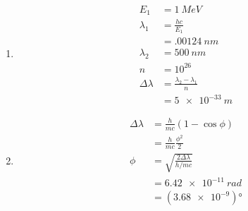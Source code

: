 \documentclass{article}
\begin{document}
\setcounter{subsubsection}{32}
\subsubsection{}

\begin{enumerate}
  \item

        \begin{align*}
          E_1            & = \qty{1}{MeV}                    \\
          \lambda_1      & = \frac{h c}{E_1}                 \\
                         & = \qty{.00124}{nm}                \\
          \lambda_2      & = \qty{500}{nm}                   \\
          n              & = 10^{26}                         \\
          \Delta \lambda & = \frac{\lambda_2 - \lambda_1}{n} \\
                         & = \qty{5e-33}{m}
        \end{align*}

  \item

        \begin{align*}
          \Delta \lambda & = \frac{h}{m c} (1 - \cos \phi)           \\
                         & = \frac{h}{m c} \frac{\phi^2}{2}          \\
          \phi           & = \sqrt{\frac{2 \Delta \lambda}{h / m c}} \\
                         & = \qty{6.42e-11}{rad}                     \\
                         & = (\num{3.68e-9}) \unit{\degree}
        \end{align*}
\end{enumerate}

\setcounter{subsubsection}{34}
\subsubsection{}
\end{document}
